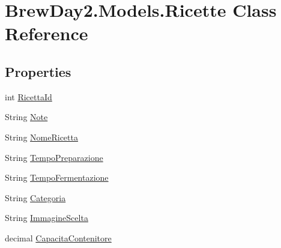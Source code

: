 \hypertarget{class_brew_day2_1_1_models_1_1_ricette}{}\section{Brew\+Day2.\+Models.\+Ricette Class Reference}
\label{class_brew_day2_1_1_models_1_1_ricette}
\subsection*{Properties}
\begin{DoxyCompactItemize}
\item 
int \mbox{\hyperlink{class_brew_day2_1_1_models_1_1_ricette_a7e8517b2a23a53ed398bd940a128413b}{Ricetta\+Id}}
\item 
String \mbox{\hyperlink{class_brew_day2_1_1_models_1_1_ricette_a1e244b82ac46c72e110d862d3b51c2b8}{Note}}
\item 
String \mbox{\hyperlink{class_brew_day2_1_1_models_1_1_ricette_a9a98b40dbf36c2564a85ec41745af431}{Nome\+Ricetta}}
\item 
String \mbox{\hyperlink{class_brew_day2_1_1_models_1_1_ricette_ace8b9d4541506b76d6395cff7ee0006b}{Tempo\+Preparazione}}
\item 
String \mbox{\hyperlink{class_brew_day2_1_1_models_1_1_ricette_abae5f77e7f92d6b58b5ee37fc6c9aa1f}{Tempo\+Fermentazione}}
\item 
String \mbox{\hyperlink{class_brew_day2_1_1_models_1_1_ricette_aacff2031285b7d5744c246bc91650c62}{Categoria}}
\item 
String \mbox{\hyperlink{class_brew_day2_1_1_models_1_1_ricette_a36a35bbae9d3d75d83b6bb86eae49b2d}{Immagine\+Scelta}}
\item 
decimal \mbox{\hyperlink{class_brew_day2_1_1_models_1_1_ricette_aa68b99836564588dcb992866f0b258cf}{Capacita\+Contenitore}}

\end{DoxyCompactItemize}
